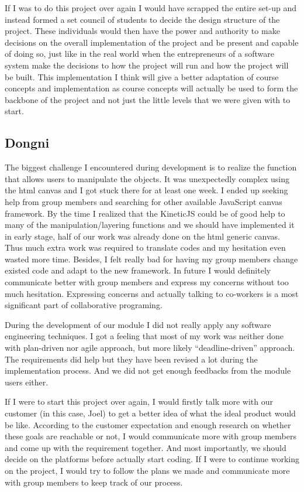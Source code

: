 \documentclass[a4paper, 11pt]{article} %
\begin{document}
If I was to do this project over again I would have scrapped the entire set-up and instead formed a set council of students to decide the design structure of the project. These individuals would then have the power and authority to make decisions on the overall implementation of the project and be present and capable of doing so, just like in the real world when the entrepreneurs of a software system make the decisions to how the project will run and how the project will be built. This implementation I think will give a better adaptation of course concepts and implementation as course concepts will actually be used to form the backbone of the project and not just the little levels that we were given with to start. 


\subsection{Dongni}
The biggest challenge I encountered during development is to realize the function that allows users to manipulate the objects. It was unexpectedly complex using the html canvas and I got stuck there for at least one week. I ended up seeking help from group members and searching for other available JavaScript canvas framework. By the time I realized that the KineticJS could be of good help to many of the manipulation/layering functions and we should have implemented it in early stage, half of our work was already done on the html generic canvas. Thus much extra work was required to translate codes and my hesitation even wasted more time. Besides, I felt really bad for having my group members change existed code and adapt to the new framework. In future I would definitely communicate better with group members and express my concerns without too much hesitation. Expressing concerns and actually talking to co-workers is a most significant part of collaborative programing.

During the development of our module I did not really apply any software engineering techniques. I got a feeling that most of my work was neither done with plan-driven nor agile approach, but more likely “deadline-driven” approach. The requirements did help but they have been revised a lot during the implementation process. And we did not get enough feedbacks from the module users either. 

If I were to start this project over again, I would firstly talk more with our customer (in this case, Joel) to get a better idea of what the ideal product would be like. According to the customer expectation and enough research on whether these goals are reachable or not, I would communicate more with group members and come up with the requirement together. And most importantly, we should decide on the platforms before actually start coding. If I were to continue working on the project, I would try to follow the plans we made and communicate more with group members to keep track of our process.
\end{document}
